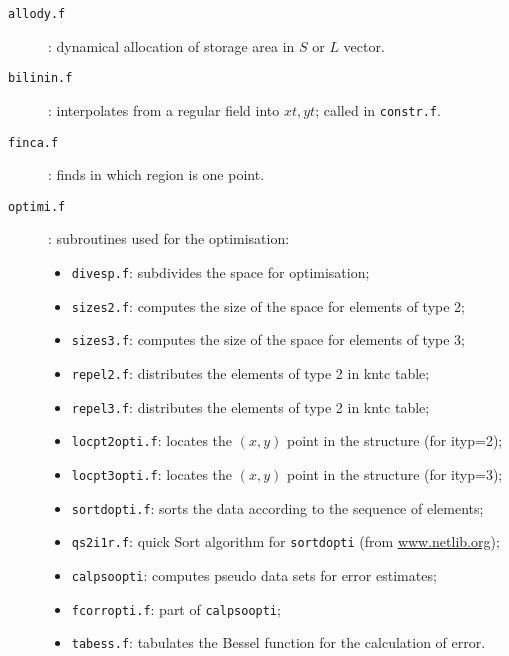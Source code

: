 \begin{description}
\item[\texttt{allody.f}]: dynamical allocation of storage area in $S$ or $L$ vector.
\item[\texttt{bilinin.f}]: interpolates from a regular field into $xt,yt$; called in \texttt{constr.f}.
\item[\texttt{finca.f}]: finds in which region is one point.
\item[\texttt{optimi.f}]: subroutines used for the optimisation:

\begin{itemize}

\item[] \texttt{divesp.f}: subdivides the space for optimisation;
\item[] \texttt{sizes2.f}: computes the size of the space for elements of type 2;
\item[] \texttt{sizes3.f}: computes the size of the space for elements of type 3;
\item[] \texttt{repel2.f}: distributes the elements of type 2 in kntc table;
\item[] \texttt{repel3.f}: distributes the elements of type 2 in kntc table;
\item[] \texttt{locpt2opti.f}:  locates the $(x,y)$ point in the structure (for ityp=2);
\item[] \texttt{locpt3opti.f}:  locates the $(x,y)$ point in the structure (for ityp=3);
\item[] \texttt{sortdopti.f}:  sorts the data according to the sequence of elements;
\item[] \texttt{qs2i1r.f}:  quick Sort algorithm for \texttt{sortdopti} (from \url{www.netlib.org});
\item[] \texttt{calpsoopti}: computes pseudo data sets for error estimates;
\item[] \texttt{fcorropti.f}:  part of \texttt{calpsoopti};
\item[] \texttt{tabess.f}: tabulates the Bessel function for the calculation of error.
\end{itemize}



\end{description}
